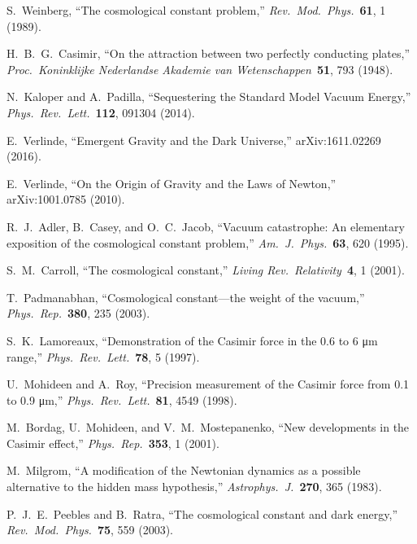 \documentclass[12pt,a4paper]{article}
\begin{document}

\begin{thebibliography}{99}

 S.~Weinberg, ``The cosmological constant problem,'' \textit{Rev.\ Mod.\ Phys.}\ \textbf{61}, 1 (1989).

 H.~B.~G.~Casimir, ``On the attraction between two perfectly conducting plates,'' \textit{Proc.\ Koninklijke Nederlandse Akademie van Wetenschappen}\ \textbf{51}, 793 (1948).

 N.~Kaloper and A.~Padilla, ``Sequestering the Standard Model Vacuum Energy,'' \textit{Phys.\ Rev.\ Lett.}\ \textbf{112}, 091304 (2014).

 E.~Verlinde, ``Emergent Gravity and the Dark Universe,'' arXiv:1611.02269 (2016).

 E.~Verlinde, ``On the Origin of Gravity and the Laws of Newton,'' arXiv:1001.0785 (2010).

 R.~J.~Adler, B.~Casey, and O.~C.~Jacob, ``Vacuum catastrophe: An elementary exposition of the cosmological constant problem,'' \textit{Am.\ J.\ Phys.}\ \textbf{63}, 620 (1995).

 S.~M.~Carroll, ``The cosmological constant,'' \textit{Living Rev.\ Relativity}\ \textbf{4}, 1 (2001).

 T.~Padmanabhan, ``Cosmological constant—the weight of the vacuum,'' \textit{Phys.\ Rep.}\ \textbf{380}, 235 (2003).

 S.~K.~Lamoreaux, ``Demonstration of the Casimir force in the 0.6 to 6 μm range,'' \textit{Phys.\ Rev.\ Lett.}\ \textbf{78}, 5 (1997).

 U.~Mohideen and A.~Roy, ``Precision measurement of the Casimir force from 0.1 to 0.9 μm,'' \textit{Phys.\ Rev.\ Lett.}\ \textbf{81}, 4549 (1998).

 M.~Bordag, U.~Mohideen, and V.~M.~Mostepanenko, ``New developments in the Casimir effect,'' \textit{Phys.\ Rep.}\ \textbf{353}, 1 (2001).

 M.~Milgrom, ``A modification of the Newtonian dynamics as a possible alternative to the hidden mass hypothesis,'' \textit{Astrophys.\ J.}\ \textbf{270}, 365 (1983).

 P.~J.~E.~Peebles and B.~Ratra, ``The cosmological constant and dark energy,'' \textit{Rev.\ Mod.\ Phys.}\ \textbf{75}, 559 (2003).


\end{thebibliography}
\end{document}
